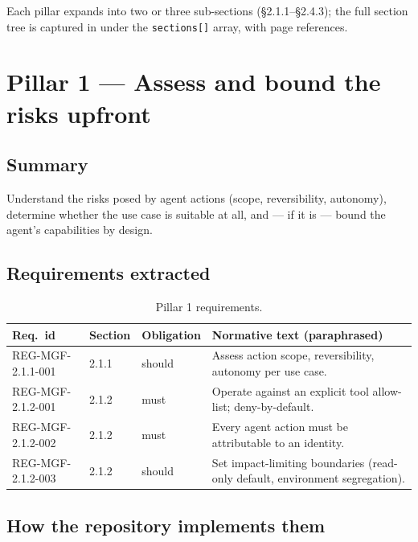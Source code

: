 Each pillar expands into two or three sub-sections (\S2.1.1--\S2.4.3); the
full section tree is captured in
 under the
\texttt{sections[]} array, with page references.

\section{Pillar 1 --- Assess and bound the risks upfront}
\label{sec:mgf-p1}

\subsection*{Summary}

Understand the risks posed by agent actions (scope, reversibility,
autonomy), determine whether the use case is suitable at all, and --- if
it is --- bound the agent's capabilities by design.

\subsection*{Requirements extracted}

\begin{table}[h]
\centering
\small
\begin{tabularx}{\textwidth}{p{3.2cm}p{1.4cm}p{1.6cm}X}
\toprule
\textbf{Req.\ id} & \textbf{Section} & \textbf{Obligation} & \textbf{Normative text (paraphrased)} \\
\midrule
REG-MGF-2.1.1-001 & 2.1.1 & should & Assess action scope, reversibility, autonomy per use case. \\
REG-MGF-2.1.2-001 & 2.1.2 & must   & Operate against an explicit tool allow-list; deny-by-default. \\
REG-MGF-2.1.2-002 & 2.1.2 & must   & Every agent action must be attributable to an identity. \\
REG-MGF-2.1.2-003 & 2.1.2 & should & Set impact-limiting boundaries (read-only default, environment segregation). \\
\bottomrule
\end{tabularx}
\caption{Pillar 1 requirements.}
\label{tab:p1}
\end{table}

\subsection*{How the repository implements them}

